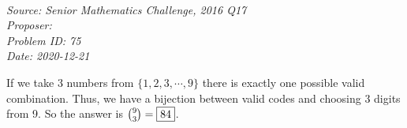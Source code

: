 \SSbreak\\
\emph{Source: Senior Mathematics Challenge, 2016 Q17}\\
\emph{Proposer: \Pss}\\
\emph{Problem ID: 75}\\
\emph{Date: 2020-12-21}\\
\SSbreak

\bigskip

\begin{solution}\hfil\medskip
  
If we take 3 numbers from \(\{1,2,3,\cdots,9\}\) there is exactly one possible valid combination. Thus, we have a bijection between valid codes and choosing 3 digits from 9. So the answer is \(\binom{9}{3}=\fbox{84}\).

\end{solution}\bigskip
